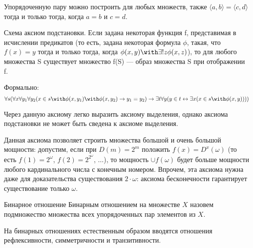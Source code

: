 \begin{lemma}
Упорядоченную пару можно построить для любых множеств, также 
$\langle{}a,b\rangle = \langle{}c,d\rangle$ тогда и только тогда,
когда $a = b$ и $c = d$.
\end{lemma}

\begin{axiom}{Схема аксиом подстановки.}
Если задана некоторая функция f, представимая в исчислении предикатов
(то есть, задана некоторая формула $\phi$, такая, что $f(x) = y$
тогда и только тогда, когда $\phi(x,y) \with \exists ! z \phi(x,z)$),
то для любого множества S существует множество f(S) --- образ
множества S при отображении f.

Формально: 
$$\forall s (\forall x \forall y_1 \forall y_2 (x \in s \with \phi (x,y_1) \with \phi
(x,y_2) \rightarrow y_1=y_2) \rightarrow 
\exists t \forall y (y \in t 
\leftrightarrow \exists x (x \in s \with \phi (x,y)))) $$
\end{axiom}

Через данную аксиому легко выразить аксиому выделения,
%
однако аксиома подстановки не может быть сведена к аксиоме выделения.

Данная аксиома позволяет строить множества большой и очень большой мощности:
допустим, если при $D(m)=2^m$ положить $f(x) = D^x(\omega)$ 
(то есть $f(1) = 2^\omega$, $f(2) = 2^{2^\omega}$, $\dots$), 
то мощность $\cup f(\omega)$ будет больше мощности
любого кардинального числа с конечным номером.
Впрочем, эта аксиома нужна даже для доказательства
существования $2 \cdot \omega$: аксиома бесконечности гарантирует
существование только $\omega$.

\begin{definition}{Бинарное отношение}
Бинарным отношением на множестве $X$ назовем подмножество множества
всех упорядоченных пар элементов из $X$.
\end{definition}

На бинарных отношениях естественным образом вводятся отношения 
рефлексивности, симметричности и транзитивности.


